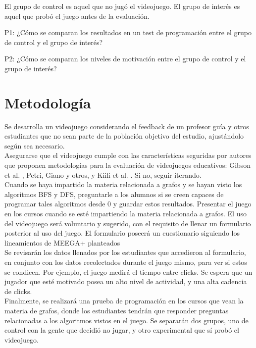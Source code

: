 \documentclass[submission]{eptcs}
\begin{document}
El grupo de control es aquel que no jugó el videojuego.
El grupo de interés es aquel que probó el juego antes de la evaluación.

P1: ¿Cómo se comparan los resultados en un test de programación entre el grupo de control y el grupo de interés?

P2: ¿Cómo se comparan los niveles de motivación entre el grupo de control y el grupo de interés?


\section{Metodología}


Se desarrolla un videojuego considerando el feedback de un profesor guía y otros estudiantes
que no sean parte de la población objetivo del estudio, ajustándolo según sea necesario. \\
Asegurarse que el videojuego cumple con las características seguridas por autores que proponen
metodologías para la evaluación de videojuegos educativos: Gibson et al. \cite{evaluation_of_games_for_teaching_cs},
Petri, Giano y otros, \cite{petri2018method} y Kiili et al. \cite{using_videogames_maths}. Si no, seguir iterando. \\
Cuando se haya impartido la materia relacionada a grafos y se hayan visto los algoritmos BFS y DFS, preguntarle a
los alumnos si se creen capaces de programar tales algoritmos desde 0 y guardar estos resultados.
Presentar el juego en los cursos cuando se esté impartiendo la materia relacionada a grafos. El uso del
videojuego será voluntario y sugerido, con el requisito de llenar un formulario posterior al uso del juego.
El formulario poseerá un cuestionario siguiendo los lineamientos de MEEGA+ planteados \cite{petri2018meegaplus} \\
Se revisarán los datos llenados por los estudiantes que accedieron al formulario, en conjunto con los
datos recolectados durante el juego mismo, para ver si estos se condicen. Por ejemplo, el juego medirá el tiempo
entre clicks. Se espera que un jugador que esté motivado posea un alto nivel de actividad, y una alta cadencia de clicks. \\
Finalmente, se realizará una prueba de programación en los cursos que vean la materia de grafos, donde los estudiantes
tendrán que responder preguntas relacionadas a los algoritmos vistos en el juego. Se separarán dos grupos, 
uno de control con la gente que decidió no jugar, y otro experimental que sí probó el videojuego.
\end{document}
